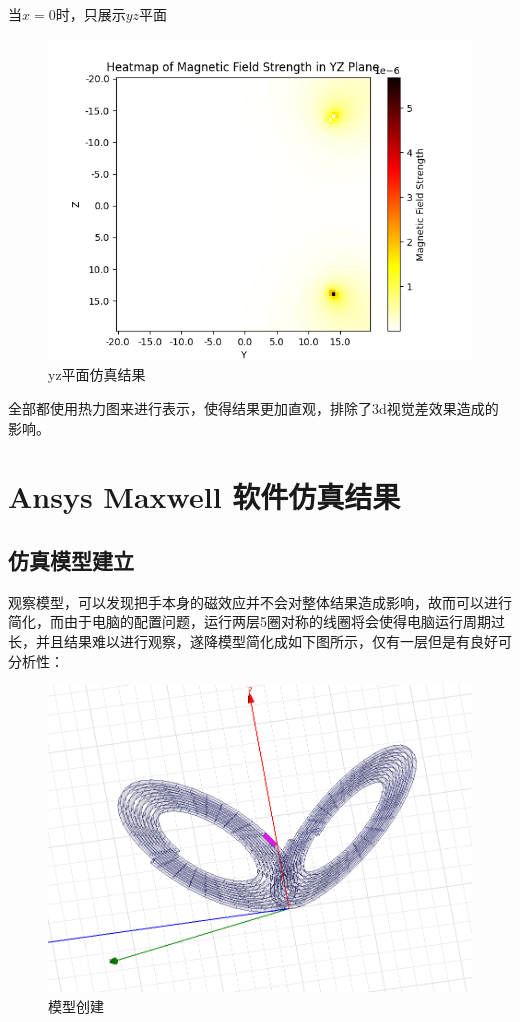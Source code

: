 \documentclass{article}
\begin{document}
当$x = 0$时，只展示$yz$平面

\begin{figure}[h]
  \centering
  \includegraphics[scale=0.35]{results/result3.png}
  \caption{yz平面仿真结果}
  \label{fig:example}
\end{figure}

全部都使用热力图来进行表示，使得结果更加直观，排除了3d视觉差效果造成的影响。

\section{Ansys Maxwell 软件仿真结果}
\subsection{仿真模型建立}
观察模型，可以发现把手本身的磁效应并不会对整体结果造成影响，故而可以进行简化，而由于电脑的配置问题，运行两层5圈对称的线圈将会使得电脑运行周期过长，并且结果难以进行观察，遂降模型简化成如下图所示，仅有一层但是有良好可分析性：

\begin{figure}[h]
  \centering
  \includegraphics[scale=0.25]{procedure/base.png}
  \caption{模型创建}
  \label{fig:example}
\end{figure}\textbf{}
\end{document}
